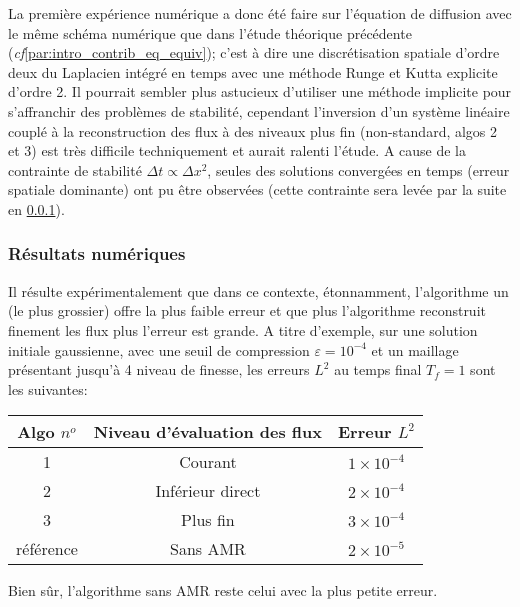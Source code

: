 La première expérience numérique a donc été faire sur l'équation de diffusion avec le même schéma numérique que dans l'étude théorique précédente (\textit{cf}\ref{par:intro_contrib_eq_equiv});
c'est à dire une discrétisation spatiale d'ordre deux du Laplacien intégré en temps avec une méthode Runge et Kutta explicite d'ordre 2. 
Il pourrait sembler plus astucieux d'utiliser une méthode implicite pour s'affranchir des problèmes de stabilité, cependant l'inversion d'un système linéaire couplé à 
la reconstruction des flux à des niveaux plus fin (non-standard, algos 2 et 3) est très difficile techniquement et aurait ralenti l'étude.
A cause de la contrainte de stabilité $\Delta t \propto \Delta x^2$, seules des solutions convergées en temps (erreur spatiale dominante) ont pu être observées (cette contrainte sera levée par la suite en \ref{}).\par 
\subsubsection{Résultats numériques}
Il résulte expérimentalement que dans ce contexte, étonnamment, l'algorithme un (le plus grossier) offre la plus faible erreur et que plus l'algorithme reconstruit finement les flux plus l'erreur est grande. 
A titre d'exemple, sur une solution initiale gaussienne, avec une seuil de compression $\varepsilon = 10^{-4}$ et un maillage présentant jusqu'à 4 niveau de finesse, les erreurs $L^2$ au temps final $T_f=1$ sont les suivantes:\par
\begin{center}\begin{tabular}{|c|c|c|}
\hline
Algo $n^o$ & Niveau d'évaluation des flux & Erreur $L^2$ \\
\hline
1 & Courant           & $1 \times 10^{-4}$ \\
2 & Inférieur direct  & $2 \times 10^{-4}$ \\
3 & Plus fin          & $3 \times 10^{-4}$ \\
référence & Sans AMR& $2 \times 10^{-5}$ \\
\hline
\end{tabular}\end{center}
Bien sûr, l'algorithme sans AMR reste celui avec la plus petite erreur.
